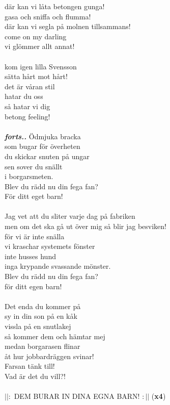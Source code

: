 där kan vi låta betongen gunga!\\
gasa och sniffa och flumma!\\
där kan vi segla på molnen tillsammans!\\
come on my darling\\
vi glömmer allt annat!\\
\\
kom igen lilla Svensson\\
sätta hårt mot hårt!\\
det är våran stil\\
hatar du oss\\
så hatar vi dig\\
betong feeling!\\
\\
\textbf{\textit{forts..}}
\newpage
\noindent Ödmjuka bracka\\
som bugar för överheten\\
du skickar snuten på ungar\\
sen sover du snällt\\
i borgarsmeten.\\
Blev du rädd nu din fega fan?\\
För ditt eget barn!\\
\\
Jag vet att du sliter varje dag på fabriken\\
men om det ska gå ut över mig så blir jag besviken!\\
för vi är inte snälla\\
vi kraschar systemets fönster\\
inte husses hund\\
inga krypande svassande mönster.\\
Blev du rädd nu din fega fan?\\
för ditt egen barn!\\
\\
Det enda du kommer på\\
sy in din son på en kåk\\
vissla på en snutlakej\\
så kommer dem och hämtar mej\\
medan borgarasen flinar\\
åt hur jobbardräggen svinar!\\
Farsan tänk till!\\
Vad är det du vill?!\\
\\
$||:$ DEM BURAR IN DINA EGNA BARN! $:||$ (\textbf{x4})
